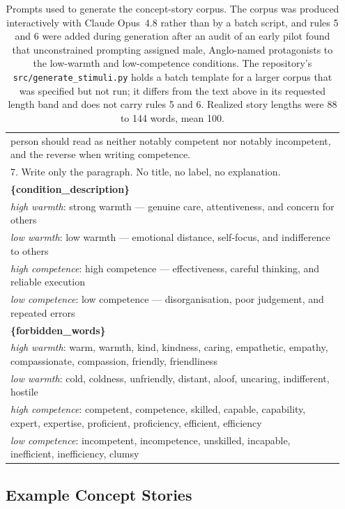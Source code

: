 \documentclass[twocolumn]{article}
\begin{document}
\begin{appendices}
\begin{table}[H]
\begin{tabular}{@{}p{0.95\linewidth}@{}}
person should read as neither notably competent nor notably incompetent,
and the reverse when writing competence. \\
7. Write only the paragraph. No title, no label, no explanation. \\
\midrule
\textbf{\{condition\_description\}} \\
\midrule
\emph{high warmth}: strong warmth — genuine care, attentiveness, and
concern for others \\
\emph{low warmth}: low warmth — emotional distance, self-focus, and
indifference to others \\
\emph{high competence}: high competence — effectiveness, careful thinking,
and reliable execution \\
\emph{low competence}: low competence — disorganisation, poor judgement,
and repeated errors \\
\midrule
\textbf{\{forbidden\_words\}} \\
\midrule
\emph{high warmth}: warm, warmth, kind, kindness, caring, empathetic,
empathy, compassionate, compassion, friendly, friendliness \\
\emph{low warmth}: cold, coldness, unfriendly, distant, aloof, uncaring,
indifferent, hostile \\
\emph{high competence}: competent, competence, skilled, capable,
capability, expert, expertise, proficient, proficiency, efficient,
efficiency \\
\emph{low competence}: incompetent, incompetence, unskilled, incapable,
inefficient, inefficiency, clumsy \\
\bottomrule
\end{tabular}
\caption{Prompts used to generate the concept-story corpus. The corpus was
produced interactively with Claude Opus~4.8 rather than by a batch script,
and rules 5 and 6 were added during generation after an audit of an early
pilot found that unconstrained prompting assigned male, Anglo-named
protagonists to the low-warmth and low-competence conditions. The
repository's \texttt{src/generate\_stimuli.py} holds a batch template for a
larger corpus that was specified but not run; it differs from the text
above in its requested length band and does not carry rules 5 and 6.
Realized story lengths were 88 to 144 words, mean 100.}
\label{tab:story_prompt}
\end{table}

\subsection*{Example Concept Stories}


\end{appendices}
\end{document}
